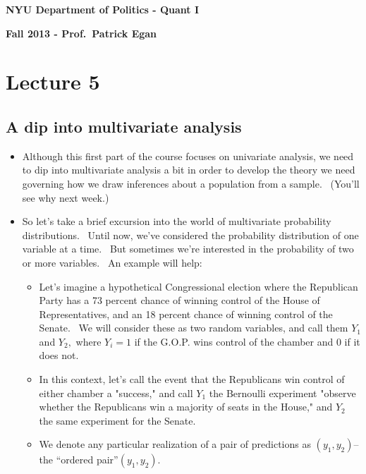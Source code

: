 \documentclass[11pt]{article}
\begin{document}
\singlespacing

\textbf{NYU Department of Politics - Quant I}

\textbf{Fall 2013 - Prof.\ Patrick Egan}

\doublespacing

\section{Lecture 5}

\subsection{A dip into multivariate analysis}

\begin{itemize}
\item Although this first part of the course focuses on univariate analysis,
we need to dip into multivariate analysis a bit in order to develop the
theory we need governing how we draw inferences about a population from a
sample. \ (You'll see why next week.)

\item So let's take a brief excursion into the world of multivariate
probability distributions. \ Until now, we've considered the probability
distribution of one variable at a time. \ But sometimes we're interested in
the probability of two or more variables. \ An example will help:

\begin{itemize}
\item Let's imagine a hypothetical Congressional election where the
Republican Party has a 73 percent chance of winning control of the House of
Representatives, and an 18 percent chance of winning control of the Senate.
\ We will consider these as two random variables, and call them $Y_{1}$ and $%
Y_{2},$ where $Y_{i}=1$ if the G.O.P. wins control of the chamber and 0 if
it does not.

\item In this context, let's call the event that the Republicans win control
of either chamber a "success," and call $Y_{1}$ the Bernoulli experiment
"observe whether the Republicans win a majority of seats in the House," and $%
Y_{2}$ the same experiment for the Senate. \ 

\item We denote any particular realization of a pair of predictions as $%
(y_{1},y_{2})$--the \textquotedblleft ordered pair\textquotedblright $%
(y_{1},y_{2}).$


\end{itemize}
\end{itemize}
\end{document}
